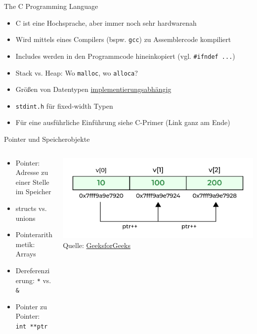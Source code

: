 \documentclass[
  german,            %
  aspectratio=169,    %
]{tumbeamer}
\begin{document}
\begin{frame}[c, fragile]{The C Programming Language}{}
  \begin{itemize}
    \item C ist eine Hochsprache, aber immer noch sehr hardwarenah
    \item Wird mittels eines Compilers (bspw. \verb|gcc|) zu Assemblercode kompiliert
    \item Includes werden in den Programmcode hineinkopiert (vgl. \verb|#ifndef ...|)
    \item Stack vs. Heap: Wo \verb|malloc|, wo \verb|alloca|?
    \item Größen von Datentypen \underline{implementierungsabhängig}
    \item \verb|stdint.h| für fixed-width Typen
    \item Für eine ausführliche Einführung siehe C-Primer (Link ganz am Ende)
  \end{itemize}
\end{frame}

\begin{frame}[c, fragile]{Pointer und Speicherobjekte}{}
  \begin{columns}[c]
    \begin{column}{0.5\textwidth}
      \begin{itemize}
        \item Pointer: Adresse zu einer Stelle im Speicher
        \item structs vs. unions
        \item Pointerarithmetik: Arrays
        \item Dereferenzierung: \verb|*| vs. \verb|&|
        \item Pointer zu Pointer: \verb|int **ptr|
      \end{itemize}
    \end{column}
    \begin{column}{0.5\textwidth}
      \includegraphics[width=1\textwidth]{w01_pointers.png}
      \centering
      \tiny{Quelle: \href{https://www.geeksforgeeks.org/c-pointers/}{GeeksforGeeks}}
    \end{column}
  \end{columns}
\end{frame}
\end{document}
